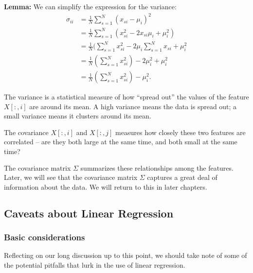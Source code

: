 \documentclass[]{article}
\begin{document}
\textbf{Lemma:} We can simplify the expression for the variance:
\[\begin{aligned}
\sigma_{ii} &= \frac{1}{N}\sum_{s=1}^{N} (x_{si}-\mu_{i})^2\\
&=\frac{1}{N}\sum_{s=1}^{N}( x_{si}^2-2x_{si}\mu_{i}+\mu_{i}^2)\\
&=\frac{1}{N}(\sum_{s=1}^{N} x_{si}^2  -2\mu_{i}\sum_{s=1}^{N} x_{si}+\mu_{i}^2 \\
&=\frac{1}{N}(\sum_{s=1}^{N} x_{si}^2) -2\mu_{i}^2 + \mu_{i}^2 \\
&=\frac{1}{N}(\sum_{s=1}^{N} x_{si}^2) -\mu_{i}^2 .
\end{aligned}
\]

The variance is a statistical measure of how ``spread out'' the values
of the feature \(X[:,i]\) are around its mean. A high variance means the
data is spread out; a small variance means it clusters around its mean.

The covariance \(X[:,i]\) and \(X[:,j]\) measures how closely these two
features are correlated -- are they both large at the same time, and
both small at the same time?

The covariance matrix \(\Sigma\) summarizes these relationships among
the features. Later, we will see that the covariance matrix \(\Sigma\)
captures a great deal of information about the data. We will return to
this in later chapters.

\hypertarget{caveats-about-linear-regression}{%
\subsection{Caveats about Linear
Regression}\label{caveats-about-linear-regression}}

\hypertarget{basic-considerations}{%
\subsubsection{Basic considerations}\label{basic-considerations}}

Reflecting on our long discussion up to this point, we should take note
of some of the potential pitfalls that lurk in the use of linear
regression.
\end{document}
